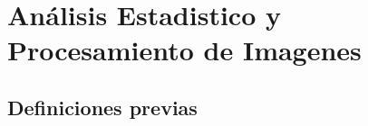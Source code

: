 \chapter{Análisis Estadistico y Procesamiento de Imagenes }\label{chap2}


\section{Definiciones previas}

